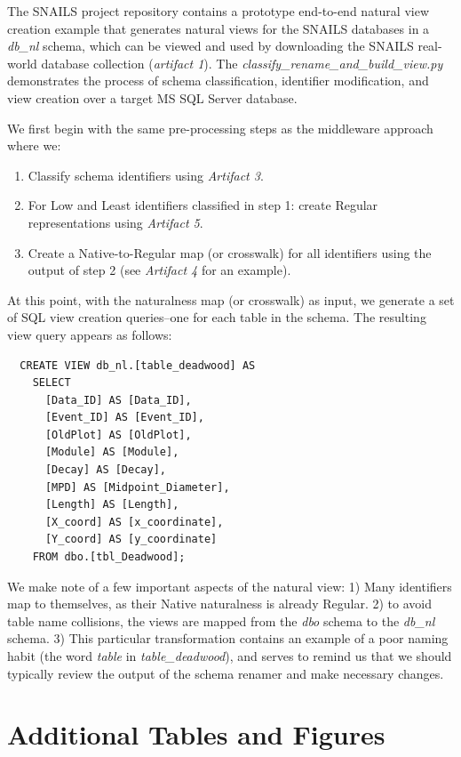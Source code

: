 The SNAILS project repository contains a prototype end-to-end natural view creation example that generates natural views for the SNAILS databases in a \emph{db\_nl} schema, which can be viewed and used by downloading the SNAILS real-world database collection (\emph{artifact 1}).
The \emph{classify\_rename\_and\_build\_view.py} demonstrates the process of schema classification, identifier modification, and view creation over a target MS SQL Server database.

We first begin with the same pre-processing steps as the middleware approach where we:
\begin{enumerate}
  \item Classify schema identifiers using \emph{Artifact 3}.
  \item For Low and Least identifiers classified in step 1: create Regular representations using \emph{Artifact 5}.
  \item Create a Native-to-Regular map (or crosswalk) for all identifiers using the output of step 2 (see \emph{Artifact 4} for an example).
\end{enumerate}

At this point, with the naturalness map (or crosswalk) as input, we generate a set of SQL view creation queries--one for each table in the schema.
The resulting view query appears as follows:

\begin{verbatim}
  CREATE VIEW db_nl.[table_deadwood] AS
    SELECT 
      [Data_ID] AS [Data_ID], 
      [Event_ID] AS [Event_ID], 
      [OldPlot] AS [OldPlot], 
      [Module] AS [Module], 
      [Decay] AS [Decay], 
      [MPD] AS [Midpoint_Diameter], 
      [Length] AS [Length], 
      [X_coord] AS [x_coordinate], 
      [Y_coord] AS [y_coordinate]
    FROM dbo.[tbl_Deadwood];
\end{verbatim}

We make note of a few important aspects of the natural view: 1) Many identifiers map to themselves, as their Native naturalness is already Regular. 2) to avoid table name collisions, the views are mapped from the \emph{dbo} schema to the \emph{db\_nl} schema. 3) This particular transformation contains an example of a poor naming habit (the word \emph{table} in \emph{table\_deadwood}), and serves to remind us that we should typically review the output of the schema renamer and make necessary changes.


\section{Additional Tables and Figures}


